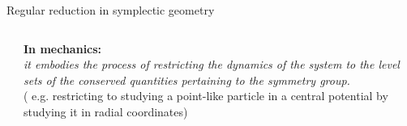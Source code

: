 \documentclass[handout,10pt]{beamer}
\begin{document}
\begin{frame}{Regular reduction in symplectic geometry}
\begin{columns}
\begin{column}{0.40\textwidth}
          \end{column}
    
          \begin{column}{0.6\textwidth}
            \textbf{\color{UniGreen}In mechanics:}~~
            \\
            {\it \small
            it embodies the process of restricting the dynamics of the system to the level sets of the conserved quantities pertaining to the symmetry group.
            }
            \\[.2em]
            \color{gray}\small( e.g. restricting to studying a point-like particle in a central potential by studying it in radial coordinates)
          \end{column}
        \end{columns}
      \end{frame}
\end{document}
